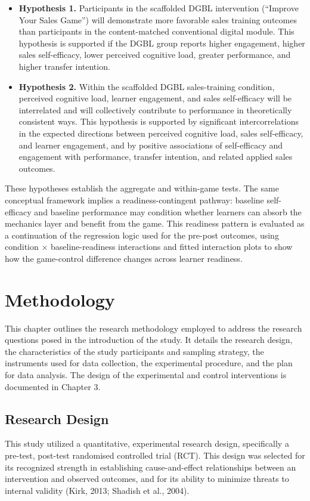 \documentclass[12pt]{report}
\begin{document}
\begin{itemize}[leftmargin=1.2cm]
    \item \textbf{Hypothesis 1.} Participants in the scaffolded DGBL intervention (``Improve Your Sales Game'') will demonstrate more favorable sales training outcomes than participants in the content-matched conventional digital module. This hypothesis is supported if the DGBL group reports higher engagement, higher sales self-efficacy, lower perceived cognitive load, greater performance, and higher transfer intention.
    \item \textbf{Hypothesis 2.} Within the scaffolded DGBL sales-training condition, perceived cognitive load, learner engagement, and sales self-efficacy will be interrelated and will collectively contribute to performance in theoretically consistent ways. This hypothesis is supported by significant intercorrelations in the expected directions between perceived cognitive load, sales self-efficacy, and learner engagement, and by positive associations of self-efficacy and engagement with performance, transfer intention, and related applied sales outcomes.
\end{itemize}

These hypotheses establish the aggregate and within-game tests. The same conceptual framework implies a readiness-contingent pathway: baseline self-efficacy and baseline performance may condition whether learners can absorb the mechanics layer and benefit from the game. This readiness pattern is evaluated as a continuation of the regression logic used for the pre-post outcomes, using condition $\times$ baseline-readiness interactions and fitted interaction plots to show how the game-control difference changes across learner readiness.

\chapter{Methodology}
\label{sec:method}
This chapter outlines the research methodology employed to address the research questions posed in the introduction of the study. It details the research design, the characteristics of the study participants and sampling strategy, the instruments used for data collection, the experimental procedure, and the plan for data analysis. The design of the experimental and control interventions is documented in Chapter 3.

\section{Research Design}
This study utilized a quantitative, experimental research design, specifically a pre-test, post-test randomised controlled trial (RCT). This design was selected for its recognized strength in establishing cause-and-effect relationships between an intervention and observed outcomes, and for its ability to minimize threats to internal validity (Kirk, 2013; Shadish et al., 2004).
\end{document}
